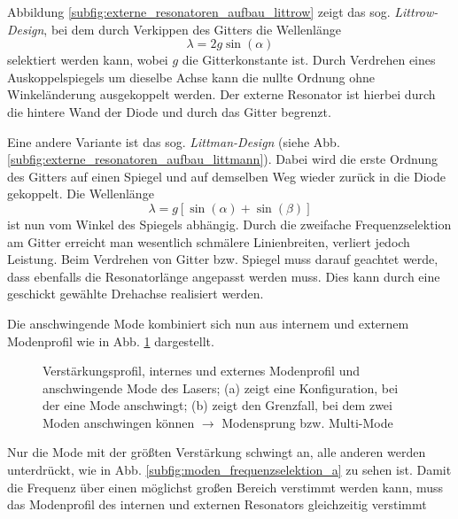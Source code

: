 Abbildung \ref{subfig:externe_resonatoren_aufbau_littrow} zeigt das sog.
\textit{Littrow-Design}, bei dem durch Verkippen des Gitters die Wellenlänge
\begin{equation}\label{eq:littrow}
	\lambda=2g\sin{(\alpha)}
\end{equation}
selektiert werden kann, wobei $g$ die Gitterkonstante ist. Durch Verdrehen eines
Auskoppelspiegels um dieselbe Achse kann die nullte Ordnung ohne Winkeländerung ausgekoppelt werden. Der
externe Resonator ist hierbei durch die hintere Wand der Diode und durch das
Gitter begrenzt.\par
Eine andere Variante ist das sog. \textit{Littman-Design} (siehe Abb.
\ref{subfig:externe_resonatoren_aufbau_littmann}). Dabei wird die erste Ordnung
des Gitters auf einen Spiegel und auf demselben Weg wieder zurück in die
Diode gekoppelt. Die Wellenlänge
\begin{equation}\label{eq:littmann}
	\lambda=g\left[\sin{(\alpha)}+\sin{(\beta)}\right]
\end{equation}
ist nun vom Winkel des Spiegels abhängig. Durch die zweifache Frequenzselektion
am Gitter erreicht man wesentlich schmälere Linienbreiten, verliert jedoch
Leistung. Beim Verdrehen von Gitter bzw. Spiegel muss darauf geachtet werde,
dass ebenfalls die Resonatorlänge angepasst werden muss. Dies kann durch
eine geschickt gewählte Drehachse realisiert werden.\par
Die anschwingende Mode kombiniert sich nun aus internem und externem Modenprofil
wie in Abb. \ref{fig:moden_frequenzselektion} dargestellt.
\begin{figure}[h]
	\footnotesize	
	\centering
	\subfigure[]{
		\label{subfig:moden_frequenzselektion_a}
		
  	}
	\subfigure[]{
		\label{subfig:moden_frequenzselektion_b}
		
  	}
	\caption[Diodenlaser - Verstärkungsprofil]{Verstärkungsprofil, internes und
	externes Modenprofil und anschwingende Mode des
	Lasers; (a) zeigt eine Konfiguration, bei der eine Mode anschwingt; (b) zeigt
	den Grenzfall, bei dem zwei Moden anschwingen können $\rightarrow$
	Modensprung bzw. Multi-Mode}
	\label{fig:moden_frequenzselektion}
\end{figure}
Nur die Mode mit der größten Verstärkung schwingt an, alle anderen
werden unterdrückt, wie in Abb. \ref{subfig:moden_frequenzselektion_a} zu sehen
ist.
Damit die Frequenz über einen möglichst großen Bereich verstimmt werden kann,
muss das Modenprofil des internen und externen Resonators gleichzeitig verstimmt
